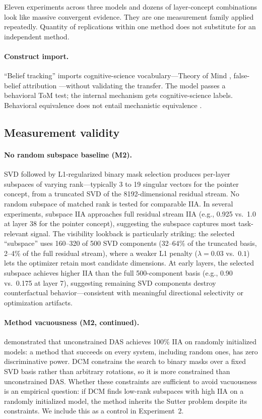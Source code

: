 \documentclass{article}
\begin{document}
Eleven experiments across three models and dozens of layer-concept combinations look like massive convergent evidence. They are one measurement family applied repeatedly. Quantity of replications within one method does not substitute for an independent method.

\paragraph{Construct import.}
``Belief tracking'' imports cognitive-science vocabulary---Theory of Mind \citep{premack1978chimpanzee}, false-belief attribution \citep{wimmer1983beliefs}---without validating the transfer. The model passes a behavioral ToM test; the internal mechanism gets cognitive-science labels. Behavioral equivalence does not entail mechanistic equivalence \citep{ruis2025reevaluating}.

\subsection{Measurement validity}

\paragraph{No random subspace baseline (M2).}
SVD followed by L1-regularized binary mask selection produces per-layer subspaces of varying rank---typically 3 to 19 singular vectors for the pointer concept, from a truncated SVD of the 8192-dimensional residual stream. No random subspace of matched rank is tested for comparable IIA. In several experiments, subspace IIA approaches full residual stream IIA (e.g., 0.925 vs.\ 1.0 at layer 38 for the pointer concept), suggesting the subspace captures most task-relevant signal. The visibility lookback is particularly striking: the selected ``subspace'' uses 160--320 of 500 SVD components (32--64\% of the truncated basis, 2--4\% of the full residual stream), where a weaker L1 penalty ($\lambda = 0.03$ vs.\ $0.1$) lets the optimizer retain most candidate dimensions. At early layers, the selected subspace achieves higher IIA than the full 500-component basis (e.g., 0.90 vs.\ 0.175 at layer 7), suggesting remaining SVD components destroy counterfactual behavior---consistent with meaningful directional selectivity or optimization artifacts.

\paragraph{Method vacuousness (M2, continued).}
\citet{sutter2025vacuous} demonstrated that unconstrained DAS achieves 100\% IIA on randomly initialized models: a method that succeeds on every system, including random ones, has zero discriminative power. DCM constrains the search to binary masks over a fixed SVD basis rather than arbitrary rotations, so it is more constrained than unconstrained DAS. Whether these constraints are sufficient to avoid vacuousness is an empirical question: if DCM finds low-rank subspaces with high IIA on a randomly initialized model, the method inherits the Sutter problem despite its constraints. We include this as a control in Experiment~2.
\end{document}
